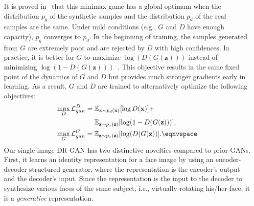 \documentclass[10pt,journal,compsoc]{IEEEtran}
\begin{document}
It is proved in~\cite{goodfellow2014generative} that this minimax game has a global optimum when the distribution $p_{g}$ of the synthetic samples and the distribution $p_{d}$ of the real samples are the same. 
Under mild conditions (e.g., $G$ and $D$ have enough capacity), $p_{g}$ converges to $p_{d}$. 
In the beginning of training, the samples generated from $G$ are extremely poor and are rejected by $D$ with high confidences.
In practice, it is better for $G$ to maximize $\log(D(G(\mathbf{z})))$ instead of minimizing $\log \left( 1 - D(G(\mathbf{z})) \right)$~\cite{goodfellow2014generative}. This objective results in the
same fixed point of the dynamics of $G$ and $D$ but provides much stronger gradients early in learning.
As a result, $G$ and $D$ are trained to alternatively optimize the following objectives:
\vspace{-1mm}\begin{align}
\max_{D} \mathcal{L}_{gan}^{D} = {} & \mathbb{E}_{\mathbf{x} \sim p_{d}(\mathbf{x})} [\log D({\bf{x}})] + \nonumber \\ 
 & \mathbb{E}_{\mathbf{z} \sim p_{z}(\mathbf{z})} [\log(1- D(G(\mathbf{z}))) ], \\
\max_{G} \mathcal{L}_{gan}^{G} = {} & \mathbb{E}_{\mathbf{z} \sim p_{z}(\mathbf{z})} [\log(D(G(\mathbf{z})) ].
\eqnvspace\vspace{-5mm}
\end{align}%
Our single-image DR-GAN has two distinctive novelties compared to prior GANs.
First, it learns an identity representation for a face image by using an encoder-decoder structured generator, where the representation is the encoder's output and the decoder's input.
Since the representation is the input to the decoder to synthesize various faces of the same subject, i.e., virtually rotating his/her face, it is a {\it generative} representation.
\end{document}
